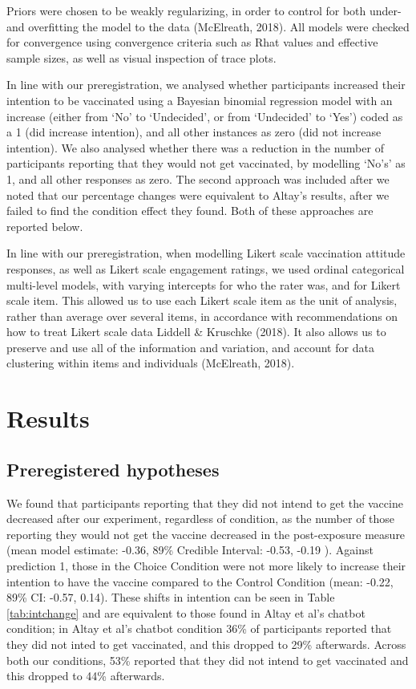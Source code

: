 \documentclass[
  english,
  ,jou,floatsintext]{apa6}
\begin{document}
Priors were chosen to be weakly regularizing, in order to control for both under- and overfitting the model to the data (McElreath, 2018). All models were checked for convergence using convergence criteria such as Rhat values and effective sample sizes, as well as visual inspection of trace plots.

In line with our preregistration, we analysed whether participants increased their intention to be vaccinated using a Bayesian binomial regression model with an increase (either from `No' to `Undecided', or from `Undecided' to `Yes') coded as a 1 (did increase intention), and all other instances as zero (did not increase intention). We also analysed whether there was a reduction in the number of participants reporting that they would not get vaccinated, by modelling `No's' as 1, and all other responses as zero. The second approach was included after we noted that our percentage changes were equivalent to Altay's results, after we failed to find the condition effect they found. Both of these approaches are reported below.

In line with our preregistration, when modelling Likert scale vaccination attitude responses, as well as Likert scale engagement ratings, we used ordinal categorical multi-level models, with varying intercepts for who the rater was, and for Likert scale item. This allowed us to use each Likert scale item as the unit of analysis, rather than average over several items, in accordance with recommendations on how to treat Likert scale data Liddell \& Kruschke (2018). It also allows us to preserve and use all of the information and variation, and account for data clustering within items and individuals (McElreath, 2018).

\hypertarget{results}{%
\section{Results}\label{results}}

\hypertarget{preregistered-hypotheses-1}{%
\subsection{Preregistered hypotheses}\label{preregistered-hypotheses-1}}

We found that participants reporting that they did not intend to get the vaccine decreased after our experiment, regardless of condition, as the number of those reporting they would not get the vaccine decreased in the post-exposure measure (mean model estimate: -0.36, 89\% Credible Interval: -0.53, -0.19 ). Against prediction 1, those in the Choice Condition were not more likely to increase their intention to have the vaccine compared to the Control Condition (mean: -0.22, 89\% CI: -0.57, 0.14). These shifts in intention can be seen in Table \ref{tab:intchange} and are equivalent to those found in Altay et al's chatbot condition; in Altay et al's chatbot condition 36\% of participants reported that they did not inted to get vaccinated, and this dropped to 29\% afterwards. Across both our conditions, 53\% reported that they did not intend to get vaccinated and this dropped to 44\% afterwards.
\end{document}
